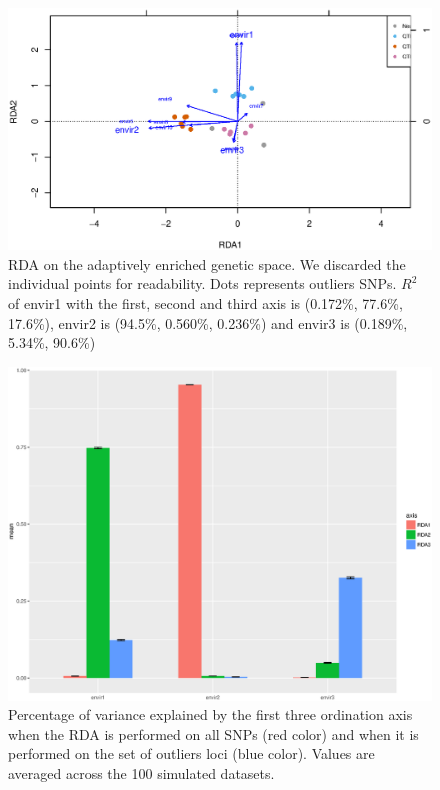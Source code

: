 \documentclass[a4paper,times,10pt,authoryear]{article}%
\begin{document}
\begin{figure}[t]
\begin{center}
\includegraphics[height=0.4\textheight]{figures/rdaA.eps}
\end{center}
\caption{RDA on the adaptively enriched genetic space. We discarded the individual points for readability. Dots represents outliers SNPs.  $R^2$ of envir1 with the first, second and third axis is (0.172\%, 77.6\%, 17.6\%), envir2 is (94.5\%, 0.560\%, 0.236\%) and envir3 is (0.189\%, 5.34\%, 90.6\%)}%
\label{fig:rdaA}%
\end{figure}

\begin{figure}[t]
\begin{center}
\includegraphics[height=0.4\textheight]{figures/R2.eps}
\end{center}
\caption{Percentage of variance explained by the first three ordination axis when the RDA is performed on all SNPs (red color) and when it is performed on the set of outliers loci (blue color). Values are averaged across the 100 simulated datasets.}%
\label{fig:R2}%
\end{figure}
\end{document}
